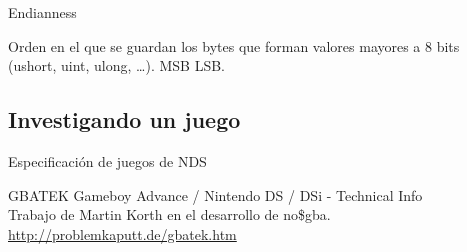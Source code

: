 \begin{frame}{Endianness}
    \begin{block}{}
        Orden en el que se guardan los bytes que forman valores mayores a 8 bits (ushort, uint, ulong, \ldots). MSB \textrightarrow LSB.
    \end{block}
    \centering{}
    \vfill
\end{frame}

\subsection{Investigando un juego}
\begin{frame}{Especificación de juegos de NDS}
    \begin{block}{GBATEK}
        \centering
         Gameboy Advance / Nintendo DS / DSi - Technical Info \\
         Trabajo de Martin Korth en el desarrollo de no\$gba.
        \url{http://problemkaputt.de/gbatek.htm}
    \end{block}
    \vfill
    \small
    \begin{columns}
    \begin{column}{0.3\textwidth}
    \end{column}
    \begin{column}{0.3\textwidth}
    \end{column}
    \begin{column}{0.3\textwidth}
    \end{column}
    \end{columns}
\end{frame}

